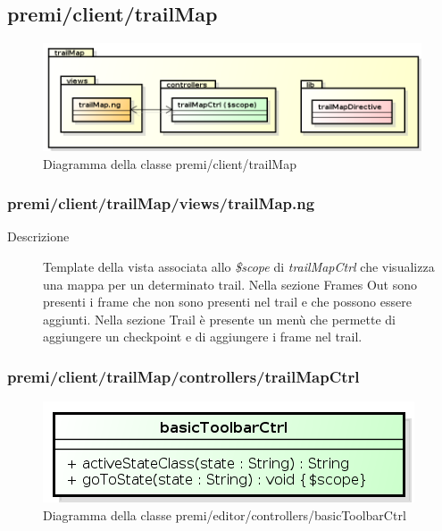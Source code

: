 \clearpage
\subsection{premi/client/trailMap}
\begin{figure}[H]
\begin{center}
\includegraphics[scale=0.70]{img/diapkg/trailMap.png}
\caption{Diagramma della classe premi/client/trailMap}
\end{center}
\end{figure}

\subsubsection{premi/client/trailMap/views/trailMap.ng}

\begin{description}
\item[Descrizione] \hfill
	Template della vista associata allo \textit{\$scope} di \textit{trailMapCtrl} che visualizza una mappa per un determinato trail. Nella sezione Frames Out sono presenti i frame che non sono presenti nel trail e che possono essere aggiunti. Nella sezione Trail è presente un menù che permette di aggiungere un checkpoint e di aggiungere i frame nel trail. 
\end{description}

\subsubsection{premi/client/trailMap/controllers/trailMapCtrl}
\begin{figure}[H]
\begin{center}
\includegraphics[scale=0.85]{img/diacla/basicToolbarCtrl.png}
\caption{Diagramma della classe premi/editor/controllers/basicToolbarCtrl}
\end{center}
\end{figure}


